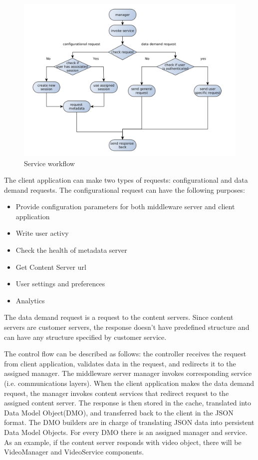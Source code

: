 \begin{figure}[h]
    \centering
	\includegraphics[width=\textwidth]{images/via_service_1.png}
    \caption{Service workflow}
    \label{fig:via_service}
\end{figure}


The client application can make two types of requests: configurational and data demand requests.
The configurational request can have the following purposes:

\begin{itemize}
	\item Provide configuration parameters for both middleware server and client application
	\item Write user activy
	\item Check the health of metadata server
	\item Get Content Server url
	\item User settings and preferences
	\item Analytics
\end{itemize}


The data demand request is a request to the content servers. Since content servers are customer servers, the response doesn't have predefined structure and can have any structure specified by customer service. 

The control flow can be described as follows: the controller receives the request from client application, validates data in the request, and redirects it to the assigned manager. The middleware server manager invokes corresponding service (i.e. communications layers). When the client application makes the data demand request, the manager invokes content services that redirect request to the assigned content server. The response is then stored in the cache, translated into Data Model Object(DMO), and transferred back to the client in the JSON format. The DMO builders are in charge of translating JSON data into persistent Data Model Objects. For every DMO there is an assigned manager and service. As an example, if the content server responds with video object, there will be VideoManager and VideoService components.   

